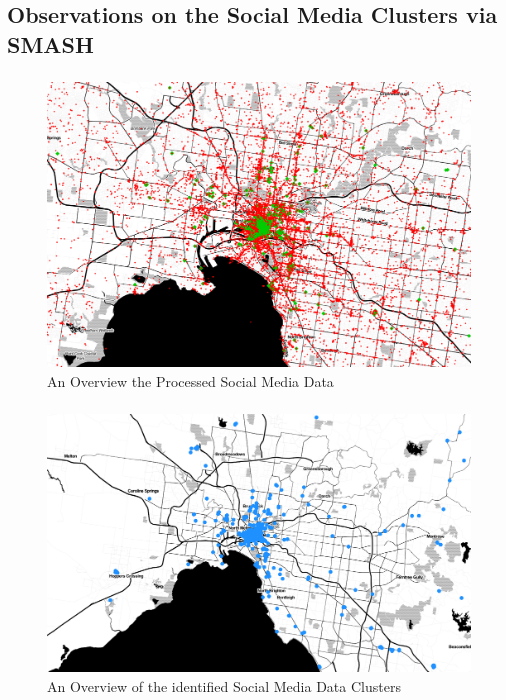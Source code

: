 \subsection{Observations on the Social Media Clusters via SMASH}
\begin{frame}
    \frametitle{}
    \begin{figure}		  
	    \includegraphics[width=0.95\columnwidth]{resource/figures/clustered_social_media_overview}
	    \centering
	    \vspace{-0.3cm}
	    \caption{\small An Overview the Processed Social Media Data}
    \end{figure}
\end{frame}

\begin{frame}
    \frametitle{}
    \begin{figure}		  
	    \includegraphics[width=0.95\columnwidth]{resource/figures/socialmedia_clusters.png}
	    \centering
	    \vspace{-0.3cm}
	    \caption{\small An Overview of the identified Social Media Data Clusters}
    \end{figure}
\end{frame}

